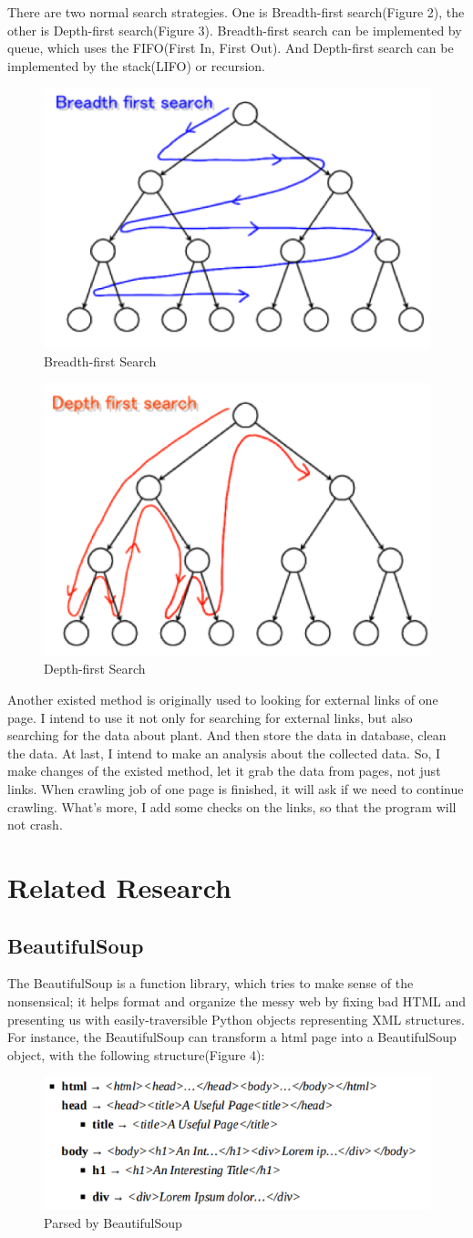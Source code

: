 \documentclass[twocolumn,10pt]{article}
\begin{document}
There are two normal search strategies.  One is Breadth-first search(Figure 2), the other is Depth-first search(Figure 3). Breadth-first search can be implemented by queue, which uses the FIFO(First In, First Out). And Depth-first search can be implemented by the stack(LIFO) or recursion.\par
\begin{figure}
	\centering
	\includegraphics[width = .3\textwidth]{pic2.png}
	\caption{Breadth-first Search}
\end{figure}
\begin{figure}
	\centering
	\includegraphics[width = .3\textwidth]{pic3.png}
	\caption{Depth-first Search}
\end{figure}
Another existed method is originally used to looking for external links of one page. I intend to use it not only for searching for external links, but also searching for the data about plant. And then store the data in database, clean the data. At last, I intend to make an analysis about the collected data. So, I make changes of the existed method, let it grab the data from pages, not just links. When crawling job of one page is finished, it will ask if we need to continue crawling. What's more, I add some checks on the links, so that the program will not crash.\par
\section{Related Research}
\subsection{BeautifulSoup}
The BeautifulSoup is a function library, which tries to make sense of the nonsensical; it helps format and organize the messy web by fixing bad HTML and presenting us with easily-traversible Python objects representing XML structures. For instance, the BeautifulSoup can transform a html page into a BeautifulSoup object, with the following structure(Figure 4):\par
\begin{figure}
	\centering
	\includegraphics[width = .3\textwidth]{pic4.png}
	\caption{Parsed by BeautifulSoup}
\end{figure}
\end{document}
